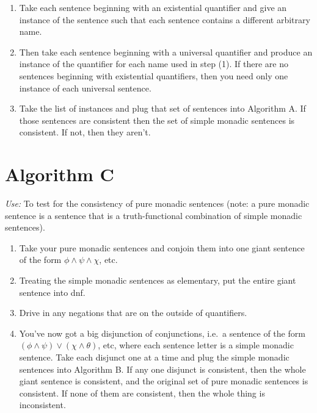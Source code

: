 \begin{enumerate} \item Take each sentence beginning with an
existential quantifier and give an instance of the sentence such that
each sentence contains a different arbitrary name.

\item Then take each
sentence beginning with a universal quantifier and produce an instance
of the quantifier for each name used in step (1).  If there are no
sentences beginning with existential quantifiers, then you need only
one instance of each universal sentence.

\item Take the list of instances and plug that set of sentences into
  Algorithm A.  If those sentences are consistent then the set of
  simple monadic sentences is consistent.  If not, then they aren't.

\end{enumerate}

\section{Algorithm C}

\textit{Use:} To test for the consistency of pure monadic sentences
(note: a pure monadic sentence is a sentence that is a
truth-functional combination of simple monadic sentences).

\begin{enumerate} \item Take your pure monadic sentences and conjoin
  them into one giant sentence of the form $\phi \wedge \psi \wedge \chi$, etc.

  \item Treating the simple monadic sentences as elementary, put the entire
    giant sentence into \gls{dnf}.

  \item Drive in any negations that are on the outside of quantifiers.

  \item You've now got a big disjunction of conjunctions, i.e.\ a
    sentence of the form
    $(\phi \wedge \psi)\vee (\chi \wedge \theta )$, etc, where each
    sentence letter is a simple monadic sentence.  Take each disjunct
    one at a time and plug the simple monadic sentences into Algorithm
    B.  If any one disjunct is consistent, then the whole giant
    sentence is consistent, and the original set of pure monadic
    sentences is consistent.  If none of them are consistent, then the
    whole thing is inconsistent. \end{enumerate}




